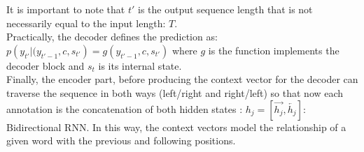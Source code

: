 \documentclass[LaM,binding=0.6cm]{sapthesis}
\begin{document}
It is important to note that $t'$ is the output sequence length that is not necessarily equal to the input length: $T$.\\Practically, the decoder defines the prediction as: $p\left(y_{t'}|(y_{t'-1},c,s_{t'}\right)=g\left(y_{t'-1},c,s_{t'}\right)$ where $g$ is the function implements the decoder block and $s_t$ is its internal state.\\Finally, the encoder part, before producing the context vector for the decoder can traverse the sequence in both ways (left/right and right/left) so that now each annotation is the concatenation of both hidden states : $h_j = \left[\overrightarrow{h_j},\overleftarrow{h_j}\right]$: Bidirectional RNN. In this way, the context vectors model the relationship of a given word with the previous and following positions.
\end{document}
